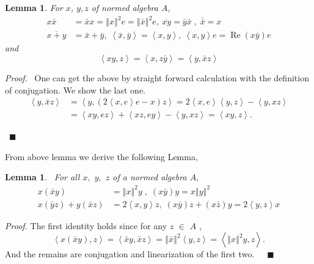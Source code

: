 \documentclass[a4paper]{article}%
\newtheorem{lemma}[theorem]{Lemma}
\newenvironment{proof}[1][Proof]{\noindent\textit{#1.} }{}
\begin{document}
\begin{lemma}
\label{conjugationLemma}For $x$, $y,z$ of normed algebra $A,$
\begin{align*}
x\bar{x}  &  =\bar{x}x=\left\Vert x\right\Vert ^{2}e=\left\Vert \bar
{x}\right\Vert ^{2}e,\ \overline{xy}=\bar{y}\bar{x}\;,\;\overline{\bar{x}}=x\\
\overline{x+y}  &  =\bar{x}+\bar{y},\;\left\langle \bar{x},\bar{y}%
\right\rangle =\left\langle x,y\right\rangle ,\ \left\langle x,y\right\rangle
e=\operatorname{Re}\left(  x\bar{y}\right)  e
\end{align*}
and
\[
\left\langle xy,z\right\rangle =\left\langle x,z\bar{y}\right\rangle
=\left\langle y,\bar{x}z\right\rangle
\]

\end{lemma}

\begin{proof}
\ One can get the above by straight forward calculation with the definition of
conjugation. We show the last one.
\begin{align*}
\left\langle y,\bar{x}z\right\rangle  &  =\left\langle y,\left(  2\left\langle
x,e\right\rangle e-x\right)  z\right\rangle =2\left\langle x,e\right\rangle
\left\langle y,z\right\rangle -\left\langle y,xz\right\rangle \\
&  =\left\langle xy,ez\right\rangle +\left\langle xz,ey\right\rangle
-\left\langle y,xz\right\rangle =\left\langle xy,z\right\rangle .
\end{align*}


\ $\blacksquare$
\end{proof}

From above lemma we derive the following Lemma,

\begin{lemma}
\label{ConjugationLemma2}\ For all $x,$ $y,$ $z$ of a normed algebra $A,$%
\begin{align*}
x\left(  \bar{x}y\right)   &  =\left\Vert x\right\Vert ^{2}y\;,\;\left(
x\bar{y}\right)  y=x\left\Vert y\right\Vert ^{2}\\
x\left(  \bar{y}z\right)  +y\left(  \bar{x}z\right)   &  =2\left\langle
x,y\right\rangle z,\;\left(  x\bar{y}\right)  z+\left(  x\bar{z}\right)
y=2\left\langle y,z\right\rangle x
\end{align*}

\end{lemma}

\begin{proof}
The first identity holds since for any $z$ $\in$ $A$ ,
\[
\left\langle x\left(  \bar{x}y\right)  ,z\right\rangle =\left\langle \bar
{x}y,\bar{x}z\right\rangle =\left\Vert \bar{x}\right\Vert ^{2}\left\langle
y,z\right\rangle =\left\langle \left\Vert x\right\Vert ^{2}y,z\right\rangle .
\]
And the remains are conjugation and linearization of the first
two.\ \ \ $\blacksquare$
\end{proof}
\end{document}

